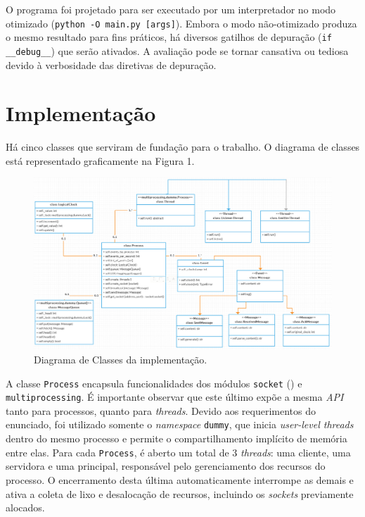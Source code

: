 \documentclass[a4paper,12pt]{article}
\begin{document}
            O programa foi projetado para ser executado por um interpretador no modo otimizado (\texttt{python -O main.py [args]}).
            Embora o modo não-otimizado produza o mesmo resultado para fins práticos, há diversos gatilhos de depuração (\texttt{if \_\_debug\_\_}) que serão ativados.
            A avaliação pode se tornar cansativa ou tediosa devido à verbosidade das diretivas de depuração.

        
        \section{Implementação}
        
        Há cinco classes que serviram de fundação para o trabalho.
        O diagrama de classes está representado graficamente na Figura 1.

        \begin{figure}[h]
            \begin{center}
                \includegraphics[width=1\textwidth]{class-diagram}
                \caption{Diagrama de Classes da implementação.}
            \end{center}
        \end{figure}

        A classe \texttt{Process} encapsula funcionalidades dos módulos \texttt{socket} (\cite{WEBSITE:7}) e \texttt{multiprocessing}.
        É importante observar que este último expõe a mesma \emph{API} tanto para processos, quanto para \emph{threads}.
        Devido aos requerimentos do enunciado, foi utilizado somente o \emph{namespace} \texttt{dummy}, que inicia \emph{user-level threads} dentro do mesmo processo e permite o compartilhamento implícito de memória entre elas.
        Para cada \texttt{Process}, é aberto um total de 3 \emph{threads}: uma cliente, uma servidora e uma principal, responsável pelo gerenciamento dos recursos do processo.
        O encerramento desta última automaticamente interrompe as demais e ativa a coleta de lixo e desalocação de recursos, incluindo os \emph{sockets} previamente alocados.
        
\end{document}
